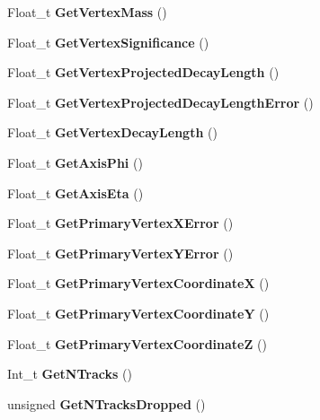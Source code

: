 \begin{CompactItemize}
\item 
Float\_\-t \textbf{Get\-Vertex\-Mass} ()\label{classTVertex_c94ae1f4516ce154c1b3ed768e457719}

\item 
Float\_\-t \textbf{Get\-Vertex\-Significance} ()\label{classTVertex_296ef06acc017382c7f8dc3b7a1f8bcc}

\item 
Float\_\-t \textbf{Get\-Vertex\-Projected\-Decay\-Length} ()\label{classTVertex_55efa6467bd6c17c20f5d12506355a1f}

\item 
Float\_\-t \textbf{Get\-Vertex\-Projected\-Decay\-Length\-Error} ()\label{classTVertex_80751606fe403a6b33de6c911ba67501}

\item 
Float\_\-t \textbf{Get\-Vertex\-Decay\-Length} ()\label{classTVertex_32088f262eaa102e1b88d6308c71941c}

\item 
Float\_\-t \textbf{Get\-Axis\-Phi} ()\label{classTVertex_13d0b88a1cf1403852b77a0dc174a6f9}

\item 
Float\_\-t \textbf{Get\-Axis\-Eta} ()\label{classTVertex_e42e7665bee94c8179530de34a23df58}

\item 
Float\_\-t \textbf{Get\-Primary\-Vertex\-XError} ()\label{classTVertex_846e51f6d8f247cdb4983949aa2b4c06}

\item 
Float\_\-t \textbf{Get\-Primary\-Vertex\-YError} ()\label{classTVertex_b5b578eff7dff8b302dded7842f6e358}

\item 
Float\_\-t \textbf{Get\-Primary\-Vertex\-Coordinate\-X} ()\label{classTVertex_d233c4c2c05c752c0acd6f8a340dde94}

\item 
Float\_\-t \textbf{Get\-Primary\-Vertex\-Coordinate\-Y} ()\label{classTVertex_50a08588735755d676121b4f6b88ed3c}

\item 
Float\_\-t \textbf{Get\-Primary\-Vertex\-Coordinate\-Z} ()\label{classTVertex_88e81de9682f142b79530055f2b77b74}

\item 
Int\_\-t \textbf{Get\-NTracks} ()\label{classTVertex_22264dcc175c0ab02ea4222201a851c1}

\item 
unsigned \textbf{Get\-NTracks\-Dropped} ()\label{classTVertex_e44861681b2f995541d0eb147ea78209}


\end{CompactItemize}
